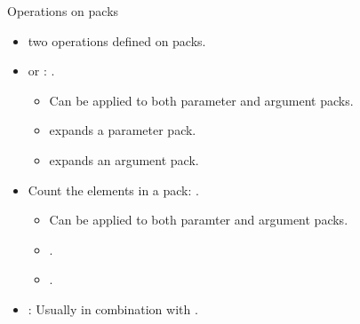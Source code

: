 \begin{frame}[t,fragile]{Operations on packs}
\begin{itemize}
  \item {} two operations defined on packs.

    \item {} or : \cppid{\ldots}.
      \begin{itemize}
        \item Can be applied to both parameter and argument packs.
        \item {} expands a parameter pack.
        \item {} expands an argument pack.
      \end{itemize}

    \item Count the elements in a pack: .
      \begin{itemize}
        \item Can be applied to both paramter and argument packs.
        \item {}\cppid{)}.
        \item {}\cppid{)}.
      \end{itemize}
 
  \item {}: Usually in combination with .
\end{itemize}
\end{frame}

